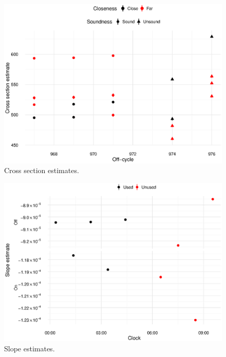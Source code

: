 \documentclass[reprint]{revtex4-1}
\newcommand{\scl}{.39}
\begin{document}
\begin{figure}
\includegraphics[scale=\scl]{img/Cross-Section_all.eps}
\caption{Cross section estimates.\label{fig:CS-all}}
\end{figure}%
\begin{figure}
\includegraphics[scale=\scl]{img/Slopes-2012_big.eps}
\caption{Slope estimates.\label{fig:Slopes}}
\end{figure}
\end{document}
